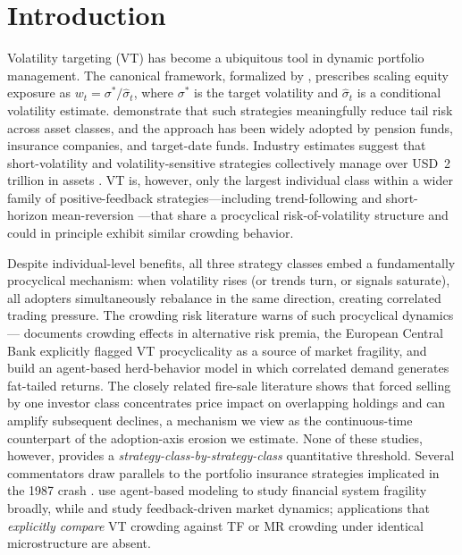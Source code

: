 \documentclass[12pt,a4paper]{article}
\begin{document}
\begin{abstract}
\medskip
\noindent
\textbf{Keywords:} volatility targeting, positive feedback, crowding, agent-based model, matched-control identification, monotone erosion

\medskip
\noindent
\textbf{JEL Classification:} G11, G12, G17, G18
\end{abstract}

\newpage

\section{Introduction}
\label{sec:intro}

Volatility targeting (VT) has become a ubiquitous tool in dynamic portfolio management. The canonical framework, formalized by \citet{moreira2017}, prescribes scaling equity exposure as $w_t = \sigma^*/\hat{\sigma}_t$, where $\sigma^*$ is the target volatility and $\hat{\sigma}_t$ is a conditional volatility estimate. \citet{harvey2018} demonstrate that such strategies meaningfully reduce tail risk across asset classes, and the approach has been widely adopted by pension funds, insurance companies, and target-date funds. Industry estimates suggest that short-volatility and volatility-sensitive strategies collectively manage over USD~2 trillion in assets \citep{cole2017}. VT is, however, only the largest individual class within a wider family of positive-feedback strategies---including trend-following \citep{moskowitz2012, asness2013} and short-horizon mean-reversion \citep{lehmann1990, lo1990}---that share a procyclical risk-of-volatility structure and could in principle exhibit similar crowding behavior.

Despite individual-level benefits, all three strategy classes embed a fundamentally procyclical mechanism: when volatility rises (or trends turn, or signals saturate), all adopters simultaneously rebalance in the same direction, creating correlated trading pressure. The crowding risk literature warns of such procyclical dynamics---\citet{baltas2019} documents crowding effects in alternative risk premia, the European Central Bank \citep[ECB,][]{ecb2020} explicitly flagged VT procyclicality as a source of market fragility, and \citet{cont2000} build an agent-based herd-behavior model in which correlated demand generates fat-tailed returns. The closely related fire-sale literature \citep{greenwood2011} shows that forced selling by one investor class concentrates price impact on overlapping holdings and can amplify subsequent declines, a mechanism we view as the continuous-time counterpart of the adoption-axis erosion we estimate. None of these studies, however, provides a \emph{strategy-class-by-strategy-class} quantitative threshold. Several commentators draw parallels to the portfolio insurance strategies implicated in the 1987 crash \citep{gennotte1990}. \citet{bookstaber2014} use agent-based modeling to study financial system fragility broadly, while \citet{lebaron2006} and \citet{danielsson2012} study feedback-driven market dynamics; applications that \emph{explicitly compare} VT crowding against TF or MR crowding under identical microstructure are absent.
\end{document}
